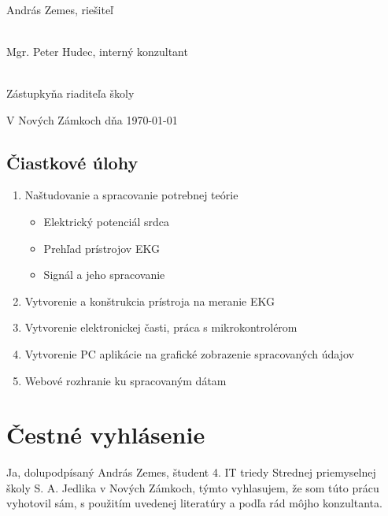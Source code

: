 \documentclass[titlepage,12pt]{article}
\begin{document}
\vspace{20mm}
\hrulefill
\\\hspace*{0mm}\phantom{v.r.: }András Zemes, riešiteľ

\vspace{10mm}
\hrulefill
\\\hspace*{0mm}\phantom{v.r.: }Mgr. Peter Hudec, interný konzultant

\vspace{10mm}
\hrulefill
\\\hspace*{0mm}\phantom{v.r.: }Zástupkyňa riaditeľa školy

\vspace{10mm}
V Nových Zámkoch dňa \today

\newpage

\subsection*{Čiastkové úlohy}
\begin{enumerate}
	\item Naštudovanie a spracovanie potrebnej teórie
	\begin{itemize}
		\item Elektrický potenciál srdca
       	\item Prehľad prístrojov EKG
       	\item Signál a jeho spracovanie
	\end{itemize}
    \item Vytvorenie a konštrukcia prístroja na meranie EKG
    \item Vytvorenie elektronickej časti, práca s mikrokontrolérom
    \item Vytvorenie PC aplikácie na grafické zobrazenie spracovaných údajov
    \item Webové rozhranie ku spracovaným dátam
\end{enumerate}

\newpage
\vspace*{\fill}
\section*{Čestné vyhlásenie}

Ja, dolupodpísaný András Zemes, študent 4. IT triedy Strednej priemyselnej školy S. A. Jedlika v Nových Zámkoch, týmto vyhlasujem, že som túto prácu   vyhotovil sám, s použitím uvedenej literatúry a podľa rád môjho konzultanta. 
\end{document}
